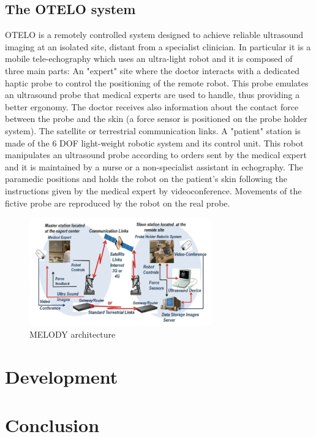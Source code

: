 \documentclass{article}
\begin{document}
\subsection{The OTELO system}
OTELO is a remotely controlled system designed to achieve reliable ultrasound imaging at an
isolated site, distant from a specialist clinician. In particular it is a mobile tele-echography which uses an ultra-light robot and it is composed of three main parts:
An "expert" site where the doctor interacts with a dedicated haptic probe to control the
positioning of the remote robot. This probe emulates an ultrasound probe that medical experts
are used to handle, thus providing a better ergonomy. The doctor receives also information
about the contact force between the probe and the skin (a force sensor is positioned on the
probe holder system).
The satellite or terrestrial communication links.
A "patient" station is made of the 6 DOF light-weight robotic system and its control unit.
This robot manipulates an ultrasound probe according to orders sent by the medical expert
and it is maintained by a nurse or a non-specialist assistant in echography. The paramedic
positions and holds the robot on the patient’s skin following the instructions given by the
medical expert by videoconference. Movements of the fictive probe are reproduced by the
robot on the real probe.
\begin{figure}[h]
    \centering
    \includegraphics[width=0.7\textwidth]{MELODY.png}  
    \caption{MELODY architecture}
    \label{fig:melody}
\end{figure}

\section{Development}

\section{Conclusion}
\end{document}
